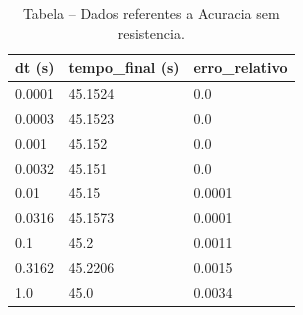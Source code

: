 \begin{table}[H]
\centering
\caption{Tabela – Dados referentes a Acuracia sem resistencia.}
\label{tab:acuracia_sem_resistencia}
\begin{tabular}{lll}
\toprule
dt (s) & tempo\_final (s) & erro\_relativo \\
\midrule
0.0001 & 45.1524 & 0.0 \\
0.0003 & 45.1523 & 0.0 \\
0.001 & 45.152 & 0.0 \\
0.0032 & 45.151 & 0.0 \\
0.01 & 45.15 & 0.0001 \\
0.0316 & 45.1573 & 0.0001 \\
0.1 & 45.2 & 0.0011 \\
0.3162 & 45.2206 & 0.0015 \\
1.0 & 45.0 & 0.0034 \\
\bottomrule
\end{tabular}

\end{table}
